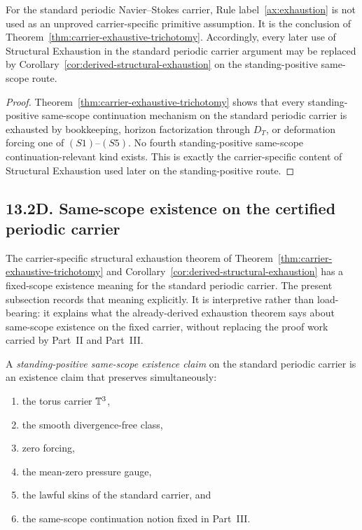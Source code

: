 \begin{manualcorollary}
\label{cor:derived-structural-exhaustion}
For the standard periodic Navier--Stokes carrier, Rule label~\ref{ax:exhaustion} is not used as an unproved carrier-specific primitive
assumption. It is the conclusion of Theorem~\ref{thm:carrier-exhaustive-trichotomy}. Accordingly,
every later use of Structural Exhaustion in the standard periodic carrier argument may be replaced by
Corollary~\ref{cor:derived-structural-exhaustion} on the standing-positive same-scope route.
\end{manualcorollary}

\begin{proof}
Theorem~\ref{thm:carrier-exhaustive-trichotomy} shows that every standing-positive same-scope continuation mechanism
on the standard periodic carrier is exhausted by bookkeeping, horizon factorization through $D_T$,
or deformation forcing one of $(S1)$--$(S5)$. No fourth standing-positive same-scope continuation-relevant kind
exists. This is exactly the carrier-specific content of Structural Exhaustion used later on the standing-positive route.
\end{proof}



\subsection*{13.2D. Same-scope existence on the certified periodic carrier}
The carrier-specific structural exhaustion theorem of Theorem~\ref{thm:carrier-exhaustive-trichotomy}
and Corollary~\ref{cor:derived-structural-exhaustion} has a fixed-scope existence meaning for the
standard periodic carrier. The present subsection records that meaning explicitly. It is
interpretive rather than load-bearing: it explains what the already-derived exhaustion theorem says
about same-scope existence on the fixed carrier, without replacing the proof work carried by
Part~II and Part~III.

\begin{manualdefinition}
\label{def:same-scope-existence-claim}
A \emph{standing-positive same-scope existence claim} on the standard periodic carrier is an existence claim that
preserves simultaneously:
\begin{enumerate}[label=(\roman*), leftmargin=2.2em]
\item the torus carrier $\mathbb{T}^3$,
\item the smooth divergence-free class,
\item zero forcing,
\item the mean-zero pressure gauge,
\item the lawful skins of the standard carrier, and
\item the same-scope continuation notion fixed in Part~III.
\end{enumerate}
\end{manualdefinition}

